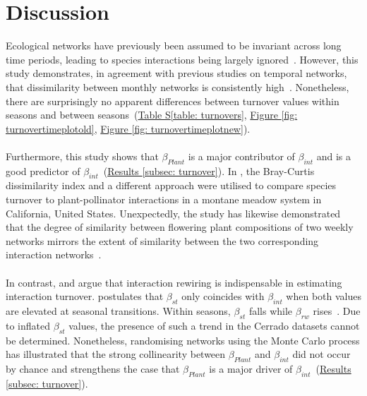 \documentclass[11pt]{article}
\begin{document}
\newpage
\section{Discussion} %
Ecological networks have previously been assumed to be invariant across long time periods, leading to species interactions being largely ignored~\citep{Poisot2015}. However, this study demonstrates, in agreement with previous studies on temporal networks, that dissimilarity between monthly networks is consistently high~\citep{Olesen2008, Burkle2013, CaraDonna2017}. Nonetheless, there are surprisingly no apparent differences between turnover values within seasons and between seasons~(\hyperref[table: turnovers]{Table S\ref{table: turnovers}}, \hyperref[fig: turnovertimeplotold]{Figure \ref{fig: turnovertimeplotold}}, \hyperref[fig: turnovertimeplotnew]{Figure \ref{fig: turnovertimeplotnew}}). \\
\\
Furthermore, this study shows that $\beta_{Plant}$ is a major contributor of $\beta_{int}$ and is a good predictor of $\beta_{int}$~(\hyperref[subsec: turnover]{Results \ref{subsec: turnover}}). In \cite{Alarcon2008}, the Bray-Curtis dissimilarity index and a different approach were utilised to compare species turnover to plant-pollinator interactions in a montane meadow system in California, United States. Unexpectedly, the study has likewise demonstrated that the degree of similarity between flowering plant compositions of two weekly networks mirrors the extent of similarity between the two corresponding interaction networks~\citep{Alarcon2008}. \\
\\
In contrast, \cite{Poisot2015} and \cite{CaraDonna2017} argue that interaction rewiring is indispensable in estimating interaction turnover. \cite{CaraDonna2017} postulates that $\beta_{st}$ only coincides with $\beta_{int}$ when both values are elevated at seasonal transitions. Within seasons, $\beta_{st}$ falls while $\beta_{rw}$ rises~\citep{CaraDonna2017}. Due to inflated $\beta_{st}$ values, the presence of such a trend in the Cerrado datasets cannot be determined. Nonetheless, randomising networks using the Monte Carlo process has illustrated that the strong collinearity between $\beta_{Plant}$ and $\beta_{int}$ did not occur by chance and strengthens the case that $\beta_{Plant}$ is a major driver of $\beta_{int}$~(\hyperref[subsec: turnover]{Results \ref{subsec: turnover}}). \\
\\
\end{document}
